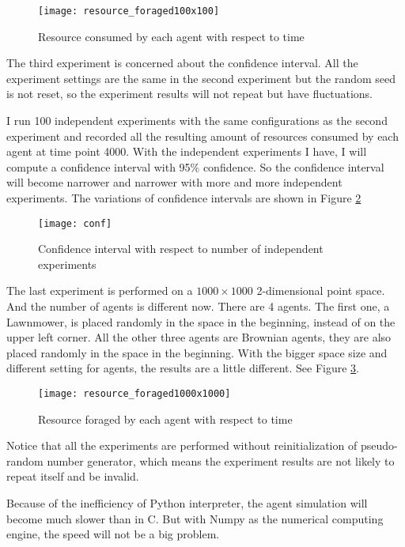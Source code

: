 \documentclass[a4paper, 12pt]{report}
\begin{document}
\begin{figure}[H]
    \centering
    \texttt{[image: resource\_foraged100x100]}
    \caption{Resource consumed by each agent with respect to time}
    \label{100x100}
\end{figure}

The third experiment is concerned about the confidence interval. All the experiment settings are the same in the second experiment but the random seed is not reset, so the experiment results will not repeat but have fluctuations. 

I run 100 independent experiments with the same configurations as the second experiment and recorded all the resulting amount of resources consumed by each agent at time point 4000. With the independent experiments I have, I will compute a confidence interval with 95\% confidence. So the confidence interval will become narrower and narrower with more and more independent experiments. The variations of confidence intervals are shown in Figure \ref{conf}

\begin{figure}[H]
    \centering
    \texttt{[image: conf]}
    \caption{Confidence interval with respect to number of independent experiments}
    \label{conf}
\end{figure}

The last experiment is performed on a $1000\times1000$ 2-dimensional point space. And the number of agents is different now. There are 4 agents. The first one,  a Lawnmower, is placed randomly in the space in the beginning, instead of on the upper left corner. All the other three agents are Brownian agents, they are also placed randomly in the space in the beginning. With the bigger space size and different setting for agents, the results are a little different. See
Figure \ref{1000x1000}.

\begin{figure}[H]
    \centering
    \texttt{[image: resource\_foraged1000x1000]}
    \caption{Resource foraged by each agent with respect to time}
    \label{1000x1000}
\end{figure}

Notice that all the experiments are performed without reinitialization of pseudo-random number generator, which means the experiment results are not likely to repeat itself and be invalid. 

Because of the inefficiency of Python interpreter, the agent simulation will become much slower than in C. But with Numpy as the numerical computing engine, the speed will not be a big problem.
\end{document}
